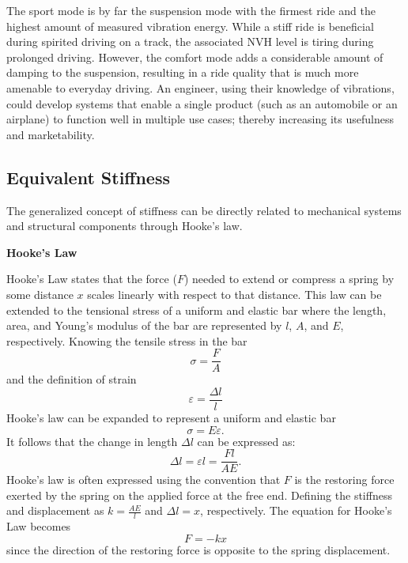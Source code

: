 \documentclass[12pt,letter]{article}
\begin{document}
\begin{vibration_case_study}
\begin{figure}[H]
    \label{fig:VW_GTI_Suspension_2}
   \end{figure}
   The sport mode is by far the suspension mode with the firmest ride and the highest amount of measured vibration energy. While a stiff ride is beneficial during spirited driving on a track, the associated NVH level is tiring during prolonged driving. However, the comfort mode adds a considerable amount of damping to the suspension, resulting in a ride quality that is much more amenable to everyday driving. An engineer, using their knowledge of vibrations, could develop systems that enable a single product (such as an automobile or an airplane) to function well in multiple use cases; thereby increasing its usefulness and marketability. 
  \end{vibration_case_study}
 
 \pagebreak 
 \subsection{Equivalent Stiffness}
  
  The generalized concept of stiffness can be directly related to mechanical systems and structural components through Hooke's law. 
  \begin{review}
      \textbf{Hooke's Law}

  \noindent Hooke's Law states that the force ($F$) needed to extend or compress a spring by some distance $x$ scales linearly with respect to that distance. This law can be extended to the tensional stress of a uniform and elastic bar where the length, area, and Young's modulus of the bar are represented by $l$, $A$, and $E$, respectively. Knowing the tensile stress in the bar
   \begin{equation}
   \sigma = \frac{F}{A}
   \end{equation}    
   and the definition of strain
   \begin{equation}
   \varepsilon = \frac{\Delta l}{l}
   \end{equation}    
   Hooke's law can be expanded to represent a uniform and elastic bar
   \begin{equation}
   \sigma = E \varepsilon.
   \end{equation}    
   It follows that the change in length $\Delta l$ can be expressed as:  
   \begin{equation}
   \Delta l = \varepsilon l = \frac{F l}{A E}.
   \end{equation} 
   Hooke's law is often expressed using the convention that $F$ is the restoring force exerted by the spring on the applied force at the free end. Defining the stiffness and displacement as $k = \frac{AE}{l}$ and $\Delta l = x$, respectively. The equation for Hooke's Law becomes
   \begin{equation}
   F = -kx
   \end{equation}    
   since the direction of the restoring force is opposite to the spring displacement.
  \end{review}
 
\end{document}
